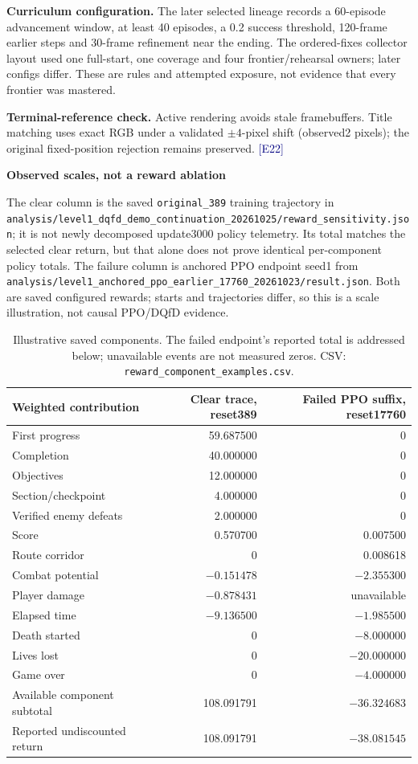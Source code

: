 \documentclass[11pt,a4paper]{article}
\newcommand{\topic}[2]{\vspace*{-4mm}{\small\color{teal}\textbf{#1}}\par{\LARGE\bfseries #2}\par\vspace{3mm}}
\newcommand{\ev}[1]{{\small\textcolor{navy}{[#1]}}}
\newcommand{\pathref}[1]{\nolinkurl{#1}}
\begin{document}
\textbf{Curriculum configuration.} The later selected lineage records a 60-episode advancement window, at least 40 episodes, a 0.2 success threshold, 120-frame earlier steps and 30-frame refinement near the ending. The ordered-fixes collector layout used one full-start, one coverage and four frontier/rehearsal owners; later configs differ. These are rules and attempted exposure, not evidence that every frontier was mastered.

\textbf{Terminal-reference check.} Active rendering avoids stale framebuffers. Title matching uses exact RGB under a validated $\pm4$-pixel shift (observed2 pixels); the original fixed-position rejection remains preserved. \ev{E22}

\clearpage
\topic{APPENDIX F / REWARD CONTRIBUTIONS}{Observed scales, not a reward ablation}
\small
The clear column is the saved \texttt{original\_389} training trajectory in \pathref{analysis/level1_dqfd_demo_continuation_20261025/reward_sensitivity.json}; it is not newly decomposed update3000 policy telemetry. Its total matches the selected clear return, but that alone does not prove identical per-component policy totals. The failure column is anchored PPO endpoint seed1 from \pathref{analysis/level1_anchored_ppo_earlier_17760_20261023/result.json}. Both are saved configured rewards; starts and trajectories differ, so this is a scale illustration, not causal PPO/DQfD evidence.

\begin{table}[ht]\centering
\begin{tabular}{@{}lrr@{}}\toprule
Weighted contribution & Clear trace, reset389 & Failed PPO suffix, reset17760\\\midrule
First progress & 59.687500 & 0\\
Completion & 40.000000 & 0\\
Objectives & 12.000000 & 0\\
Section/checkpoint & 4.000000 & 0\\
Verified enemy defeats & 2.000000 & 0\\
Score & 0.570700 & 0.007500\\
Route corridor & 0 & 0.008618\\
Combat potential & $-0.151478$ & $-2.355300$\\
Player damage & $-0.878431$ & unavailable\\
Elapsed time & $-9.136500$ & $-1.985500$\\
Death started & 0 & $-8.000000$\\
Lives lost & 0 & $-20.000000$\\
Game over & 0 & $-4.000000$\\\midrule
Available component subtotal & 108.091791 & $-36.324683$\\
Reported undiscounted return & 108.091791 & $-38.081545$\\\bottomrule
\end{tabular}
\caption{Illustrative saved components. The failed endpoint's reported total is addressed below; unavailable events are not measured zeros. CSV: \texttt{reward\_component\_examples.csv}.}\label{tab:components}
\end{table}
\end{document}
